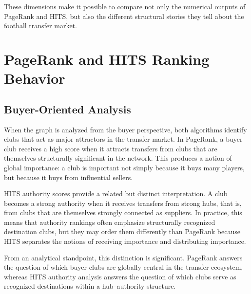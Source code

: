 These dimensions make it possible to compare not only the numerical outputs of PageRank and HITS, but also the different structural stories they tell about the football transfer market.


\section{PageRank and HITS Ranking Behavior}
\label{sec:results_ranking_behavior}

\subsection{Buyer-Oriented Analysis}
\label{subsec:results_buyers}

When the graph is analyzed from the buyer perspective, both algorithms identify clubs that act as major attractors in the transfer market. In PageRank, a buyer club receives a high score when it attracts transfers from clubs that are themselves structurally significant in the network. This produces a notion of global importance: a club is important not simply because it buys many players, but because it buys from influential sellers.

HITS authority scores provide a related but distinct interpretation. A club becomes a strong authority when it receives transfers from strong hubs, that is, from clubs that are themselves strongly connected as suppliers. In practice, this means that authority rankings often emphasize structurally recognized destination clubs, but they may order them differently than PageRank because HITS separates the notions of receiving importance and distributing importance.

From an analytical standpoint, this distinction is significant. PageRank answers the question of which buyer clubs are globally central in the transfer ecosystem, whereas HITS authority analysis answers the question of which clubs serve as recognized destinations within a hub--authority structure.

